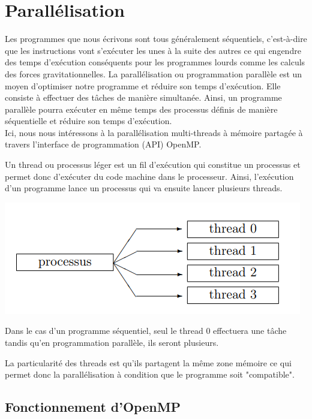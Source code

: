 \chapter{Parallélisation }
Les programmes que nous écrivons sont tous généralement séquentiels, c'est-à-dire que les instructions vont s'exécuter les unes à la suite des autres ce qui engendre des temps d'exécution conséquents pour les programmes lourds comme les calculs des forces gravitationnelles.
La parallélisation ou programmation parallèle est un moyen d'optimiser notre programme et réduire son temps d'exécution. 
Elle consiste à effectuer des tâches de manière simultanée. Ainsi, un programme parallèle pourra exécuter en même temps des processus définis de manière séquentielle et réduire son temps d'exécution.\\

Ici, nous nous intéressons à la parallélisation multi-threads à mémoire partagée à travers l'interface de programmation (API) OpenMP.

Un thread ou processus léger est un fil d'exécution qui constitue un processus et permet donc d'exécuter du code machine dans le processeur. Ainsi, l'exécution d'un programme lance un processus qui va ensuite lancer plusieurs threads.


\begin{center}
\includegraphics[scale=0.8]{images/process_thread.png}
\captionsetup{hypcap=false}
\label{fig6}
\end{center} 

Dans le cas d'un programme séquentiel, seul le thread 0 effectuera une tâche tandis qu'en programmation parallèle, ils seront plusieurs.

La particularité des threads est qu'ils partagent la même zone mémoire ce qui permet donc la parallélisation à condition que le programme soit "compatible".

\section{Fonctionnement d'OpenMP}
